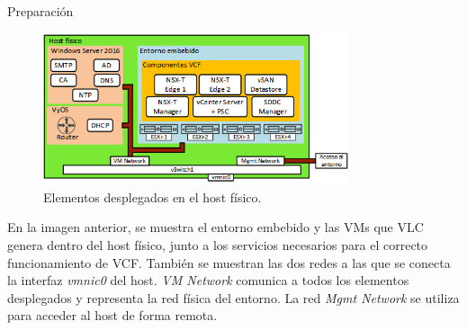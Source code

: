 \begin{subsection}{Preparación}
    \begin{figure}[h!]
      \centering
      \includegraphics[width=0.8\textwidth]{imaxes/pruebaconcepto/hostFisico.png}
      \caption{Elementos desplegados en el host físico. }
      \label{fig:estructura-generada-por-VLC}
    \end{figure}
    \FloatBarrier
    En la imagen anterior, se muestra el entorno embebido y las VMs que VLC genera dentro del host físico, junto a los servicios necesarios para el correcto funcionamiento de VCF. También	 se muestran las dos redes a las que se conecta la interfaz \textit{vmnic0} del host. \textit{VM Network} comunica a todos los elementos desplegados y representa la red física del entorno. La red \textit{Mgmt Network} se utiliza para acceder al host de forma remota.




\end{subsection}

